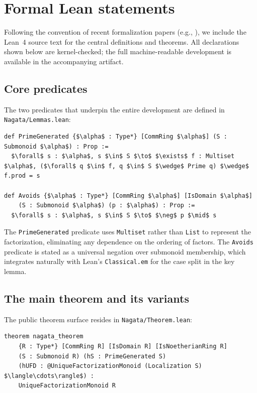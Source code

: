\documentclass[11pt]{article}
\theoremstyle{plain}
\theoremstyle{definition}
\theoremstyle{remark}
\newcommand{\li}[1]{\texorpdfstring{\texttt{#1}}{#1}}
\newcommand{\lf}[1]{\texorpdfstring{\nolinkurl{#1}}{#1}}
\begin{document}
\section{Formal Lean statements}\label{sec:lean-statements}

Following the convention of recent formalization papers (e.g.,
\cite{brasca-flt,riou-derived,loeffler-zeta}), we include the Lean~4 source
text for the central definitions and theorems.  All declarations shown below
are kernel-checked; the full machine-readable development is available in the
accompanying artifact.

\subsection{Core predicates}

The two predicates that underpin the entire development are defined in
\lf{Nagata/Lemmas.lean}:

\begin{lstlisting}[style=lean]
def PrimeGenerated {$\alpha$ : Type*} [CommRing $\alpha$] (S : Submonoid $\alpha$) : Prop :=
  $\forall$ s : $\alpha$, s $\in$ S $\to$ $\exists$ f : Multiset $\alpha$, ($\forall$ q $\in$ f, q $\in$ S $\wedge$ Prime q) $\wedge$ f.prod = s

def Avoids {$\alpha$ : Type*} [CommRing $\alpha$] [IsDomain $\alpha$]
    (S : Submonoid $\alpha$) (p : $\alpha$) : Prop :=
  $\forall$ s : $\alpha$, s $\in$ S $\to$ $\neg$ p $\mid$ s
\end{lstlisting}

\noindent
The \li{PrimeGenerated} predicate uses \li{Multiset} rather than \li{List} to
represent the factorization, eliminating any dependence on the ordering of
factors.  The \li{Avoids} predicate is stated as a universal negation over
submonoid membership, which integrates naturally with Lean's \li{Classical.em}
for the case split in the key lemma.

\subsection{The main theorem and its variants}

The public theorem surface resides in \lf{Nagata/Theorem.lean}:

\begin{lstlisting}[style=lean]
theorem nagata_theorem
    {R : Type*} [CommRing R] [IsDomain R] [IsNoetherianRing R]
    (S : Submonoid R) (hS : PrimeGenerated S)
    (hUFD : @UniqueFactorizationMonoid (Localization S) $\langle\cdots\rangle$) :
    UniqueFactorizationMonoid R
\end{lstlisting}
\end{document}
